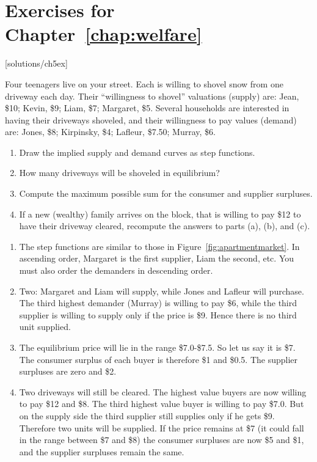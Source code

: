 \newpage
\section*{Exercises for Chapter~\ref{chap:welfare}}

\begin{enumialphparenastyle}

[solutions/ch5ex]

\begin{ex}\label{ex:ch5ex1}
Four teenagers live on your street. Each is willing to shovel snow from one driveway each day. Their ``willingness to shovel'' valuations (supply) are: Jean, \$10; Kevin, \$9; Liam, \$7; Margaret, \$5. Several households are interested in having their driveways shoveled, and their willingness to pay values (demand) are: Jones, \$8; Kirpinsky, \$4; Lafleur, \$7.50; Murray, \$6.
\begin{enumerate}
	\item	Draw the implied supply and demand curves as step functions.
	\item	How many driveways will be shoveled in equilibrium?
	\item	Compute the maximum possible sum for the consumer and supplier surpluses.
	\item	If a new (wealthy) family arrives on the block, that is willing to pay \$12 to have their driveway cleared, recompute the answers to parts (a), (b), and (c).
\end{enumerate}
\begin{sol}
\begin{enumerate}
	\item	The step functions are similar to those in Figure~\ref{fig:apartmentmarket}. In ascending order, Margaret is the first supplier, Liam the second, etc. You must also order the demanders in descending order.
	\item	Two: Margaret and Liam will supply, while Jones and Lafleur will purchase. The third highest demander (Murray) is willing to pay \$6, while the third supplier is willing to supply only if the price is \$9. Hence there is no third unit supplied.
	\item	The equilibrium price will lie in the range \$7.0-\$7.5. So	let us say it is \$7. The consumer surplus of each buyer is therefore \$1 and \$0.5. The supplier surpluses are zero and \$2.
	\item	Two driveways will still be cleared. The highest value buyers are now willing to pay \$12 and \$8. The third highest value buyer is willing to pay \$7.0. But on the supply side the third supplier still supplies only if he gets \$9. Therefore two units will be supplied. If the price remains at \$7 (it could fall in the range between \$7 and \$8) the consumer surpluses are now \$5 and \$1, and the	supplier surpluses remain the same.
\end{enumerate}
\end{sol}
\end{ex}


\end{enumialphparenastyle}
